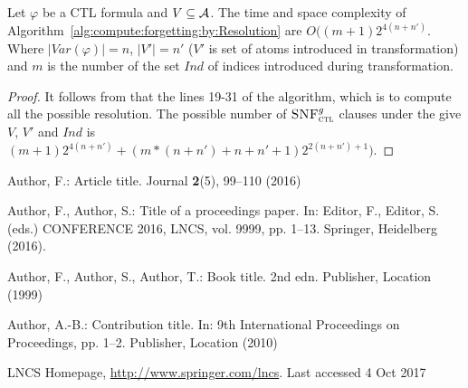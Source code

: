 \documentclass[runningheads]{llncs}
\newcommand{\Var}{\textit{Var}}
\newcommand{\Ha} {{\cal A}}
\newcommand{\CTLsnf}{{\textsc{SNF}_{\textsc{ctl}}^g}}
\begin{document}
\begin{proposition}
Let $\varphi$ be a CTL formula and $V \subseteq \Ha$.
The time and space complexity of Algorithm~\ref{alg:compute:forgetting:by:Resolution} are $O((m+1)2^{4(n+n')}$. Where $|\Var(\varphi)|=n$, $|V'|=n'$ ($V'$ is set of atoms introduced in transformation) and $m$ is the number of the set $Ind$ of indices introduced during transformation.
\end{proposition}
\begin{proof}
It follows from that the lines 19-31 of the algorithm, which is to compute all the possible resolution.
The possible number of $\CTLsnf$ clauses under the give $V$, $V'$ and $Ind$ is $(m+1)2^{4(n+n')}+(m*(n+n')+n+n'+1)2^{2(n+n')+1})$.
\end{proof}


%
%
%
 
 
%
\begin{thebibliography}{8}
Author, F.: Article title. Journal \textbf{2}(5), 99--110 (2016)

Author, F., Author, S.: Title of a proceedings paper. In: Editor,
F., Editor, S. (eds.) CONFERENCE 2016, LNCS, vol. 9999, pp. 1--13.
Springer, Heidelberg (2016). 

Author, F., Author, S., Author, T.: Book title. 2nd edn. Publisher,
Location (1999)

Author, A.-B.: Contribution title. In: 9th International Proceedings
on Proceedings, pp. 1--2. Publisher, Location (2010)

LNCS Homepage, \url{http://www.springer.com/lncs}. Last accessed 4
Oct 2017
\end{thebibliography}
\end{document}
